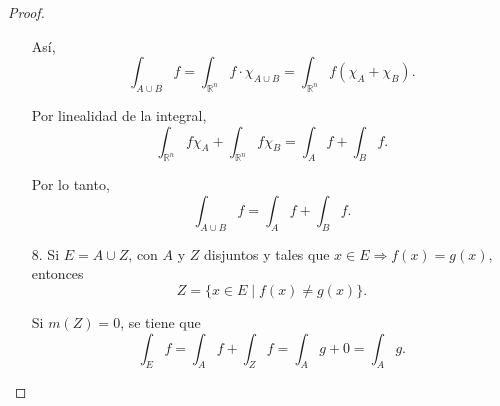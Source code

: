\begin{proof}
\begin{enumerate}
        Así,  
        $$ 
        \int_{A \cup B} f = \int_{\mathbb{R}^n} f \cdot \chi_{A \cup B} = \int_{\mathbb{R}^n} f (\chi_A + \chi_B).
        $$  
    
        Por linealidad de la integral,  
        $$ 
        \int_{\mathbb{R}^n} f \chi_A + \int_{\mathbb{R}^n} f \chi_B = \int_A f + \int_B f.
        $$  
    
        Por lo tanto,  
        $$ 
        \int_{A \cup B} f = \int_A f + \int_B f.
        $$  
    
        \item[8.] Si $E = A \cup Z$, con $A$ y $Z$ disjuntos y tales que $x \in E \Rightarrow f(x) = g(x)$, entonces  
        $$ 
        Z = \{ x \in E \mid f(x) \neq g(x) \}.
        $$  
    
        Si $m(Z) = 0$, se tiene que  
        $$ 
        \int_E f = \int_A f + \int_Z f = \int_A g + 0 = \int_A g.
        $$  
    
    \end{enumerate}
\end{proof}

